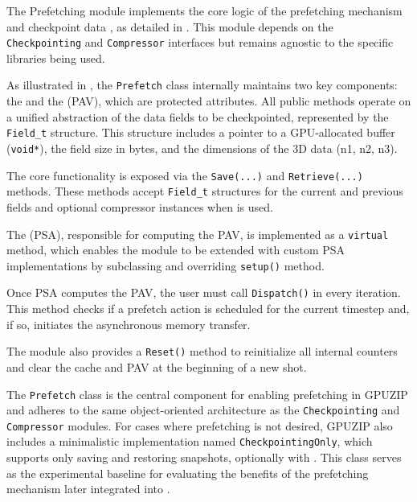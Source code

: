 \documentclass[Ingles,Final]{ic-tese-v3}
\begin{document}
The Prefetching module implements the core logic of the prefetching mechanism and checkpoint data \compression, as detailed in . This module depends on the \texttt{Checkpointing} and \texttt{Compressor} interfaces but remains agnostic to the specific libraries being used. 

As illustrated in , the \texttt{Prefetch} class internally maintains two key components: the \cache and the \pav (PAV), which are protected attributes. All public methods operate on a unified abstraction of the data fields to be checkpointed, represented by the \texttt{Field\_t} structure. This structure includes a pointer to a GPU-allocated buffer (\texttt{void*}), the field size in bytes, and the dimensions of the 3D data (n1, n2, n3).

The core functionality is exposed via the \texttt{Save(...)} and \texttt{Retrieve(...)} methods. These methods accept \texttt{Field\_t} structures for the current and previous fields and optional compressor instances when \compression is used. 

The \psa (PSA), responsible for computing the PAV, is implemented as a \texttt{virtual} method, which enables the module to be extended with custom PSA implementations by subclassing and overriding \texttt{setup()} method.

Once PSA computes the PAV, the user must call \texttt{Dispatch()} in every iteration. This method checks if a prefetch action is scheduled for the current timestep and, if so, initiates the asynchronous memory transfer.

The module also provides a \texttt{Reset()} method to reinitialize all internal counters and clear the cache and PAV at the beginning of a new shot.

The \texttt{Prefetch} class is the central component for enabling prefetching in GPUZIP and adheres to the same object-oriented architecture as the \texttt{Checkpointing} and \texttt{Compressor} modules. For cases where prefetching is not desired, GPUZIP also includes a minimalistic implementation named \texttt{CheckpointingOnly}, which supports only saving and restoring snapshots, optionally with \compression. This class serves as the experimental baseline for evaluating the benefits of the prefetching mechanism later integrated into \awave. 
\end{document}
